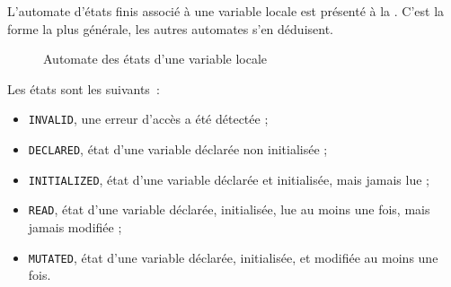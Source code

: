 L'automate d'états finis associé à une variable locale est présenté à la . C'est la forme la plus générale, les autres automates s'en déduisent.


\begin{figure}[ht!]
  \centering
  \small
  \caption{Automate des états d'une variable locale}
\end{figure}



Les états sont les suivants~:
\begin{itemize}
  \item \texttt{INVALID}, une erreur d'accès a été détectée ;
  \item \texttt{DECLARED}, état d'une variable déclarée non initialisée ;
  \item \texttt{INITIALIZED}, état d'une variable déclarée et initialisée, mais jamais lue ;
  \item \texttt{READ}, état d'une variable déclarée, initialisée, lue au moins une fois, mais jamais modifiée ;
  \item \texttt{MUTATED}, état d'une variable déclarée, initialisée, et modifiée au moins une fois.
\end{itemize}

